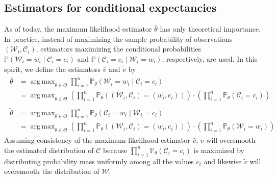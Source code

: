 \documentclass{amsart}
\theoremstyle{plain}
\theoremstyle{definition}
\renewcommand{\P}{\mathbb{P}}
\DeclareMathOperator*{\argmax}{arg\,max}
\begin{document}
\subsection{Estimators for conditional expectancies}
\label{subsec:skip-gram-cbow}
As of today, the maximum likelihood estimator $\hat \theta$ has only theoretical importance.
In practice, instead of maximizing the sample probability of observations $(\mathcal{W}_i, \mathcal{C}_i)$, estimators maximizing the conditional probabilities $\P(\mathcal{W}_i = w_i \mid \mathcal{C}_i = c_i)$ and  $\P(\mathcal{C}_i = c_i \mid \mathcal{W}_i = w_i)$, respectively, are used.
In this spirit, we define the estimators $\bar v$ and $\tilde v$ by
\begin{align}
  \label{eq:def-bar-tilde}
  \begin{split}
    \bar \theta & = \argmax_{\theta \in \Theta} \prod_{i = 1}^n \P_\theta(\mathcal{W}_i = w_i \mid \mathcal{C}_i = c_i) \\
                & = \argmax_{\theta \in \Theta} \left( \prod_{i = 1}^n \P_\theta((\mathcal{W}_i, \mathcal{C}_i) = (w_i, c_i) ) \right) \cdot \left( \prod_{i = 1}^n \P_\theta(\mathcal{C}_i = c_i) \right)
  \end{split} \\
  \begin{split}
    \tilde \theta & = \argmax_{\theta \in \Theta} \prod_{i = 1}^n \P_\theta(\mathcal{C}_i = w_i \mid \mathcal{W}_i = c_i) \\
                  & = \argmax_{\theta \in \Theta} \left( \prod_{i = 1}^n \P_\theta((\mathcal{W}_i, \mathcal{C}_i) = (w_i, c_i) ) \right) \cdot \left( \prod_{i = 1}^n \P_\theta(\mathcal{W}_i = w_i) \right)
  \end{split}
\end{align}
Assuming consistency of the maximum likelihood estimator $\hat v$, $\bar v$ will oversmooth the estimated distribution of $\mathcal{C}$ because $\prod_{i = 1}^n \P_\theta(\mathcal{C}_i = c_i)$ is maximized by distributing probability mass uniformly among all the values $c_i$ and likewise $\tilde v$ will oversmooth the distribution of $\mathcal{W}$.
\end{document}
